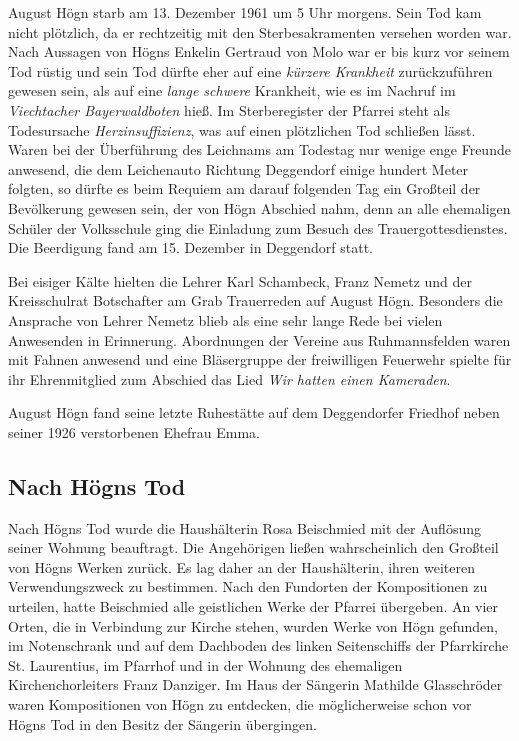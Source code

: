 \documentclass{book}
\newcommand{\zitat}[1]{\textit{#1}}
\begin{document}
August Högn starb am 13. Dezember 1961 um 5 Uhr morgens. Sein Tod kam
nicht plötzlich, da er rechtzeitig mit den Sterbesakramenten versehen
worden war. Nach Aussagen von Högns Enkelin Gertraud von Molo war er
bis kurz vor seinem Tod rüstig und sein Tod dürfte eher auf eine
\zitat{\textup{kürzere Krankheit} }zurückzuführen gewesen
sein, als auf eine \zitat{lange schwere} Krankheit, wie es im
Nachruf im \textit{Viechtacher Bayerwaldboten} hieß. Im Sterberegister
der Pfarrei steht als Todesursache \textit{Herzinsuffizienz}, was auf
einen plötzlichen Tod schließen lässt. Waren bei der Überführung des
Leichnams am Todestag nur wenige enge Freunde anwesend, die dem
Leichenauto Richtung Deggendorf einige hundert Meter folgten, so dürfte
es beim Requiem am darauf folgenden Tag ein Großteil der Bevölkerung
gewesen sein, der von Högn Abschied nahm, denn an alle ehemaligen
Schüler der Volksschule ging die Einladung zum Besuch des
Trauergottesdienstes. Die Beerdigung fand am 15. Dezember in Deggendorf
statt.

Bei eisiger Kälte hielten die Lehrer Karl Schambeck, Franz Nemetz und
der Kreisschulrat Botschafter am Grab Trauerreden auf August Högn.
Beson\-ders die Ansprache von Lehrer Nemetz blieb als eine sehr lange
Rede bei vie\-len Anwesenden in Erinnerung. Abordnungen der Vereine aus
Ruhmannsfel\-den waren mit Fahnen anwesend und eine Bläsergruppe der
freiwilligen Feu\-erwehr spielte für ihr Ehrenmitglied zum Abschied das
Lied \textit{Wir hatten einen Kameraden}.

August Högn fand seine letzte Ruhestätte auf dem Deggendorfer Friedhof
neben seiner 1926 verstorbenen Ehefrau Emma.

\subsection{Nach Högns Tod}
Nach Högns Tod wurde die Haushälterin Rosa Beischmied mit der Auflösung
seiner Wohnung beauftragt. Die Angehörigen ließen wahrscheinlich den
Großteil von Högns Werken zurück. Es lag daher an der Haushälterin,
ihren weiteren Verwendungszweck zu bestimmen. Nach den Fundorten der
Kom\-positionen zu urteilen, hatte Beischmied alle geistlichen Werke
der Pfarrei übergeben. An vier Orten, die in Verbindung zur Kirche
stehen, wurden Wer\-ke von Högn gefunden, im Notenschrank und auf dem
Dachboden des linken Seitenschiffs der Pfarrkirche St. Laurentius, im
Pfarrhof und in der Wohnung des ehemaligen Kirchenchorleiters Franz
Danziger. Im Haus der Sängerin Mathilde Glasschröder waren
Kompositionen von Högn zu entdecken, die möglicherweise schon vor Högns
Tod in den Besitz der Sängerin übergingen.
\end{document}
